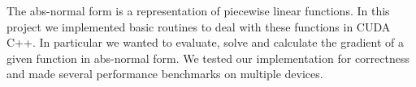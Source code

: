 The abs-normal form is a representation of piecewise linear functions.
In this project we implemented basic routines to deal with these functions in CUDA C++.
In particular we wanted to evaluate, solve and calculate the gradient of a given function in abs-normal form.
We tested our implementation for correctness and made several performance benchmarks on multiple devices.